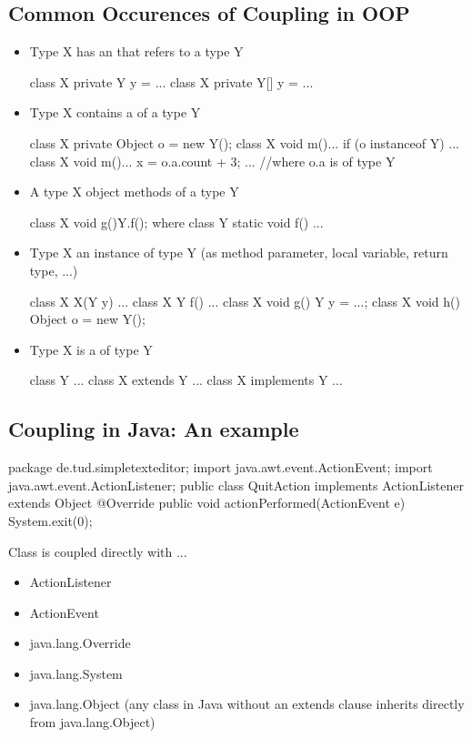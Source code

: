 \subsection{Common Occurences of Coupling in OOP}
\begin{itemize}
    \item Type X has an  that refers to a type Y
    \begin{codeBlock}{}
        class X {private Y y = ...}
        class X {private Y[] y = ...}
    \end{codeBlock}
    \item Type X contains a  of a type Y
    \begin{codeBlock}{}
        class X {private Object o = new Y();}
        class X {void m(){... if (o instanceof Y) ...}}
        class X {void m(){... x = o.a.count + 3; ...}} //where o.a is of type Y
    \end{codeBlock}
    \item A type X object  methods of a type Y
    \begin{codeBlock}{}
        class X {void g(){Y.f();}}
        where class Y {static void f() {...}}
    \end{codeBlock}
    \item Type X  an instance of type Y (as method parameter, local variable, return type, ...)
    \begin{codeBlock}{}
        class X {X(Y y) {...}}
        class X {Y f() {...}}
        class X {void g() {Y y = ...;}}
        class X {void h() {Object o = new Y();}}
    \end{codeBlock}
    \item Type X is a  of type Y
    \begin{codeBlock}{}
        class Y {...}
        class X extends Y {...}
        class X implements Y {...}
    \end{codeBlock}
\end{itemize}
\subsection{Coupling in Java: An example}
\begin{codeBlock}{}
    package de.tud.simpletexteditor;
    import java.awt.event.ActionEvent;
    import java.awt.event.ActionListener;
    public class QuitAction implements ActionListener extends Object{
        @Override
        public void actionPerformed(ActionEvent e){
            System.exit(0);
        }
    }
\end{codeBlock}
Class  is coupled directly with ...
\begin{itemize}
    \item ActionListener
    \item ActionEvent
    \item java.lang.Override
    \item java.lang.System
    \item java.lang.Object (any class in Java without an extends clause inherits directly from java.lang.Object)
\end{itemize}
